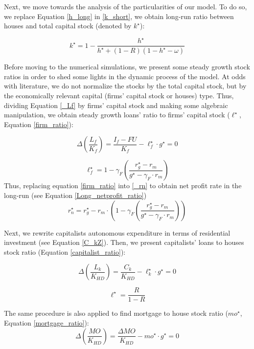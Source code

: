 \documentclass[11pt]{article}
\begin{document}
Next, we move towards the analysis of the particularities of our model.
To do so, we replace Equation \ref{h_long} in \ref{k_short}, we obtain long-run ratio between houses and total capital stock (denoted by \(k^\star\)):

\begin{equation}
\label{k_long}
k^{\star} = 1 - \frac{h^{\star}}{h^\star + (1-R)(1-h^\star - \omega)}
\end{equation}



Before moving to the numerical simulations, we present some steady growth stock ratios in order to shed some lights in the dynamic process of the model.
At odds with literature, we do not normalize the stocks by the total capital stock, but by the economically relevant capital (firms' capital stock or houses) type.
Thus, dividing Equation \ref{_Lf} by firms' capital stock and making some algebraic manipulation, we obtain steady growth loans' ratio to firms' capital stock (\(\ell^{\star}\), Equation \ref{firm_ratio}):

$$
\Delta \left(\frac{L_{f}}{K_{f}}\right) = \frac{I_{f} - FU}{K_{f}} - \ell^{\star}_{f}\cdot g^{\star}  = 0
$$

\begin{equation}
\label{firm_ratio}
\ell_f^\star = 1 - \gamma_F\left(\frac{r_g^\star - r_m}{g^\star - \gamma_F\cdot r_m}\right)
\end{equation}
Thus, replacing equation \ref{firm_ratio} into \ref{_rn} to obtain net profit rate in the long-run (see Equation \ref{Long_netprofit_ratio})
\begin{equation}
\label{Long_netprofit_ratio}
r_n^\star = r_g^\star - r_m\cdot \left(1 - \gamma_F\left(\frac{r_g^\star - r_m}{g^\star - \gamma_F\cdot r_m}\right)\right)
\end{equation}



Next, we rewrite capitalists autonomous expenditure in terms of residential investment (see Equation \ref{C_kZ}). 
Then, we  present capitalists' loans to houses stock ratio (Equation \ref{capitalist_ratio}):

$$
\Delta \left(\frac{L_k}{K_{HD}}\right) = \frac{C_k}{K_{HD}} - \ell^{\star}_{k}\cdot g^{\star} = 0
$$

\begin{equation}
\label{capitalist_ratio}
\ell^\star = \frac{R}{1-R}
\end{equation}

The same procedure is also applied to find mortgage to house stock ratio (\(mo^{\star}\), Equation \ref{mortgage_ratio}):
$$
\Delta \left(\frac{MO}{K_{HD}}\right) = \frac{\Delta MO}{K_{HD}} - mo^{\star}\cdot g^{\star} = 0
$$
\end{document}
